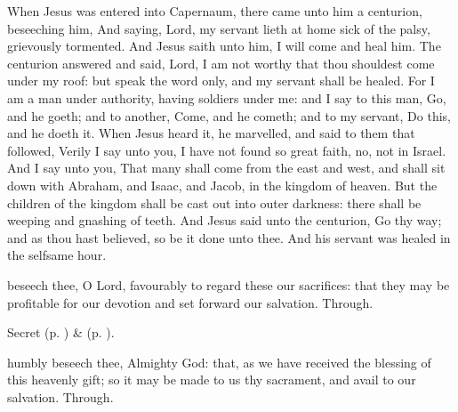 
 When Jesus was entered into Capernaum, there came unto him a centurion, beseeching him, And saying, Lord, my servant lieth at home sick of the palsy, grievously tormented. And Jesus saith unto him, I will come and heal him. The centurion answered and said, Lord, I am not worthy that thou shouldest come under my roof: but speak the word only, and my servant shall be healed. For I am a man under authority, having soldiers under me: and I say to this man, Go, and he goeth; and to another, Come, and he cometh; and to my servant, Do this, and he doeth it. When Jesus heard it, he marvelled, and said to them that followed, Verily I say unto you, I have not found so great faith, no, not in Israel. And I say unto you, That many shall come from the east and west, and shall sit down with Abraham, and Isaac, and Jacob, in the kingdom of heaven. But the children of the kingdom shall be cast out into outer darkness: there shall be weeping and gnashing of teeth. And Jesus said unto the centurion, Go thy way; and as thou hast believed, so be it done unto thee. And his servant was healed in the selfsame hour.


\secret
{} beseech thee, O Lord, favourably to regard these our sacrifices: that they may be profitable for our devotion and set forward our salvation. Through.

\begin{rubric}
     Secret  (p. \pageref{AshWednesdayMassSecret}) \&   (p. \pageref{SPLivingDeparted}).
\end{rubric}


\postcommunion
{} humbly beseech thee, Almighty God: that, as we have received the blessing of this heavenly gift; so it may be made to us thy sacrament, and avail to our salvation. Through.


